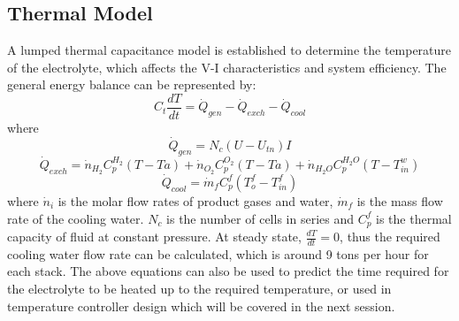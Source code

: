 \documentclass[11pt, a4paper]{article}
\begin{document}
\subsection{Thermal Model}
A lumped thermal capacitance model is established to determine the temperature of the electrolyte, which affects the V-I characteristics and system efficiency. The general energy balance can be represented by:\cite{reversible}
\begin{equation}
C_t\frac{dT}{dt} = \dot{Q}_{gen}- \dot{Q}_{exch}-\dot{Q}_{cool}
\end{equation}
where 
\begin{equation}
\dot{Q}_{gen} = N_c(U-U_{tn})I 
\end{equation}
\begin{equation}
\dot{Q}_{exch} = \dot{n}_{H_2} C_p^{H_2}(T - Ta) + \dot{n}_{O_2}C_p^{O_2}(T - Ta)+ \dot{n}_{H_2O}C_p^{H_2O}(T - T_{in}^w)
\end{equation}
\begin{equation}
\dot{Q}_{cool} = \dot{m}_fC_p^f(T_o^f - T_{in}^f) 
\end{equation}
where $\dot{n}_i$ is the molar flow rates of product gases and water, $\dot{m}_f$ is the mass flow rate of the cooling water. $N_c$ is the number of cells in series and $C_p^f$ is the thermal capacity of fluid at constant pressure. At steady state, $\frac{dT}{dt} = 0$,  thus the required cooling water flow rate can be calculated, which is around 9 tons per hour for each stack. The above equations can also be used to predict the time required for the electrolyte to be heated up to the required temperature, or used in temperature controller design which will be covered in the next session.
\end{document}

